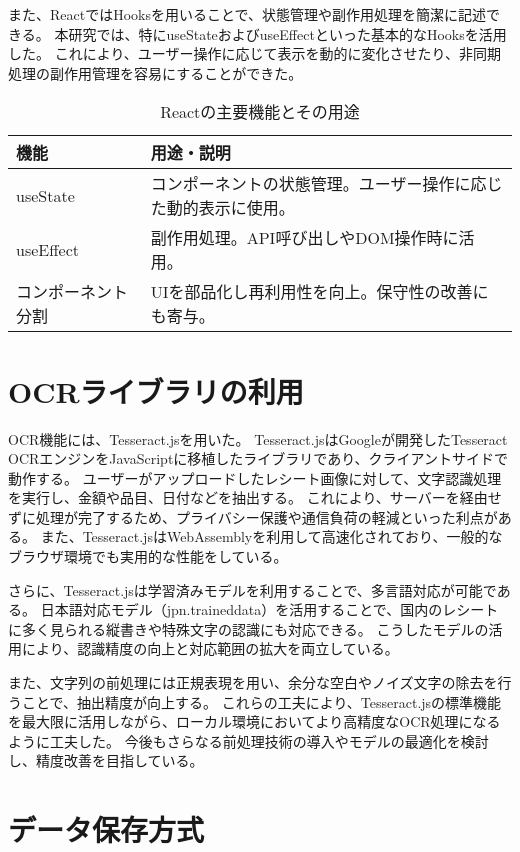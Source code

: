 \documentclass[main]{subfiles}
\begin{document}
また、ReactではHooksを用いることで、状態管理や副作用処理を簡潔に記述できる。  
本研究では、特にuseStateおよびuseEffectといった基本的なHooksを活用した。  
これにより、ユーザー操作に応じて表示を動的に変化させたり、非同期処理の副作用管理を容易にすることができた。

\begin{table}[htbp]
\centering
\caption{Reactの主要機能とその用途}
\label{tab:react_features}
\begin{tabular}{lp{9cm}}
\hline
\textbf{機能} & \textbf{用途・説明} \\
\hline
useState & コンポーネントの状態管理。ユーザー操作に応じた動的表示に使用。 \\
useEffect & 副作用処理。API呼び出しやDOM操作時に活用。 \\
コンポーネント分割 & UIを部品化し再利用性を向上。保守性の改善にも寄与。 \\
\hline
\end{tabular}
\end{table}

\section{OCRライブラリの利用}

OCR機能には、Tesseract.jsを用いた。
Tesseract.jsはGoogleが開発したTesseract OCRエンジンをJavaScriptに移植したライブラリであり、クライアントサイドで動作する。
ユーザーがアップロードしたレシート画像に対して、文字認識処理を実行し、金額や品目、日付などを抽出する。
これにより、サーバーを経由せずに処理が完了するため、プライバシー保護や通信負荷の軽減といった利点がある。
また、Tesseract.jsはWebAssemblyを利用して高速化されており、一般的なブラウザ環境でも実用的な性能をしている。

さらに、Tesseract.jsは学習済みモデルを利用することで、多言語対応が可能である。  
日本語対応モデル（jpn.traineddata）を活用することで、国内のレシートに多く見られる縦書きや特殊文字の認識にも対応できる。  
こうしたモデルの活用により、認識精度の向上と対応範囲の拡大を両立している。

また、文字列の前処理には正規表現を用い、余分な空白やノイズ文字の除去を行うことで、抽出精度が向上する。  
これらの工夫により、Tesseract.jsの標準機能を最大限に活用しながら、ローカル環境においてより高精度なOCR処理になるように工夫した。  
今後もさらなる前処理技術の導入やモデルの最適化を検討し、精度改善を目指している。


\section{データ保存方式}
\end{document}
